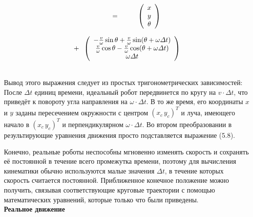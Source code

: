 \documentclass[10pt,a4paper]{article}
\begin{document}
\begin{minipage}{0.3\textwidth}
	\begin{equation*}
	\hspace{10mm}
	\mbox {=} \hspace{10mm}\left(\begin{array}{c}
	x\\
	y\\
	\theta\\
	\end{array}\right)
	\end{equation*}
\end{minipage}
\begin{minipage}{0.3\textwidth}
	\begin{equation*}
	\mbox {+} \hspace{2mm} 
	\left(\begin{array}{c}
	-\frac{v}{\omega}\sin\theta+\frac{v}{\omega}\sin(\theta+\omega\varDelta t)\\
	\frac{v}{\omega}\cos\theta-\frac{v}{\omega}\cos(\theta+\omega\varDelta t)\\
    \omega\varDelta t\\
	\end{array}\right)
	\end{equation*}
\end{minipage}\\

Вывод этого выражения следует из простых тригонометрических зависимостей: После
$\varDelta t$ единиц времени, идеальный робот передвинется по кругу на $v \cdot \varDelta t$, что приведёт к повороту угла направления на $\omega\cdot\varDelta t$. В то же время, его координаты $x$ и $y$ заданы пересечением окружности с центром $(x_c\,y_c)^T$ и луча, имеющего начало в $(x_c\,y_c)^T$ и перпендикулярном $\omega\cdot\varDelta t$. Во втором преобразовании в результирующие уравнения движения просто подставляется выражение (5.8).

Конечно, реальные роботы неспособны мгновенно изменять скорость и сохранять её постоянной в течение всего промежутка времени, поэтому для вычисления кинематики обычно используются малые значения $\varDelta t$, в течение которых скорость считается постоянной. Приближенное конечное положение можно получить, связывая соответствующие круговые траектории с помощью математических уравнений, которые только что были приведены.\\ 

\textbf{Реальное движение}\\
\end{document}
